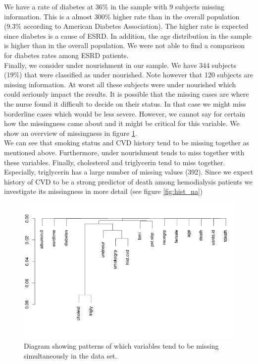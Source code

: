 \documentclass[paper=a4, fontsize=11pt]{scrartcl} %
\numberwithin{equation}{section} %
\numberwithin{figure}{section} %
\numberwithin{table}{section} %
\begin{document}
We have a rate of diabetes at 36\% in the sample with 9 subjects missing information. This is a almost 300\% higher rate than in the overall population (9.3\% according to American Diabetes Association\cite{ADA}). The higher rate is expected since diabetes is a cause of ESRD. In addition, the age distribution in the sample is higher than in the overall population. We were not able to find a comparison for diabetes rates among ESRD patients. \\

Finally, we consider under nourishment in our sample. We have 344 subjects (19\%) that were classified as under nourished. Note however that 120 subjects are missing information. At worst all these subjects were under nourished which could seriously impact the results. It is possible that the missing cases are where the nurse found it difficult to decide on their status. In that case we might miss borderline cases which would be less severe. However, we cannot say for certain how the missingness came about and it might be critical for this variable. We show an overview of missingness in figure \ref{fig:na_pattern}.\\

We can see that smoking status and CVD history tend to be missing together as mentioned above. Furthermore, under nourishment tends to miss together with these variables. Finally, cholesterol and triglycerin tend to miss together. Especially, triglycerin has a large number of missing values (392). Since we expect history of CVD to be a strong predictor of death among hemodialysis patients we investigate its missingness in more detail (see figure \ref{fig:hist_na})



\begin{figure}[H]
\centering
\includegraphics[width=.6\textwidth]{plots/na_pattern.png}
\caption{Diagram showing patterns of which variables tend to be missing simultaneously in the data set.}
\label{fig:na_pattern}
\end{figure}
\end{document}
